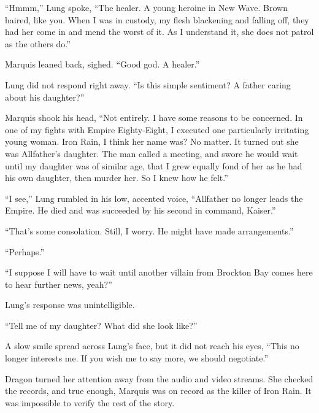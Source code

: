 ``Hmmm,'' Lung spoke, ``The healer.  A young heroine in New Wave.  Brown haired, like you.  When I was in custody, my flesh blackening and falling off, they had her come in and mend the worst of it.  As I understand it, she does not patrol as the others do.''



Marquis leaned back, sighed.  ``Good god.  A healer.''



Lung did not respond right away.  ``Is this simple sentiment?  A father caring about his daughter?''



Marquis shook his head, ``Not entirely.  I have some reasons to be concerned.  In one of my fights with Empire Eighty-Eight, I executed one particularly irritating young woman.  Iron Rain, I think her name was?  No matter.  It turned out she was Allfather's daughter.  The man called a meeting, and swore he would wait until my daughter was of similar age, that I grew equally fond of her as he had his own daughter, then murder her.  So I knew how he felt.''



``I see,'' Lung rumbled in his low, accented voice, ``Allfather no longer leads the Empire.  He died and was succeeded by his second in command, Kaiser.''



``That's some consolation.  Still, I worry.  He might have made arrangements.''



``Perhaps.''



``I suppose I will have to wait until another villain from Brockton Bay comes here to hear further news, yeah?''



Lung's response was unintelligible.



``Tell me of my daughter?  What did she look like?''



A slow smile spread across Lung's face, but it did not reach his eyes, ``This no longer interests me.  If you wish me to say more, we should negotiate.''



Dragon turned her attention away from the audio and video streams.  She checked the records, and true enough, Marquis was on record as the killer of Iron Rain.  It was impossible to verify the rest of the story.



